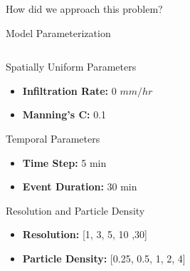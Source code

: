 \documentclass[
  ignorenonframetext,
]{beamer}
\providecommand{\tightlist}{%
  \setlength{\itemsep}{0pt}\setlength{\parskip}{0pt}}\usepackage{longtable,booktabs,array}
\begin{document}
\begin{frame}[fragile]{How did we approach this problem?}
\begin{block}{Model Parameterization}
\begin{columns}[T]
\begin{column}{0.5\textwidth}
\begin{block}{Spatially Uniform Parameters}
\begin{itemize}
\tightlist
\item
  \textbf{Infiltration Rate:} 0 \(mm/hr\)
\end{itemize}

\begin{itemize}
\tightlist
\item
  \textbf{Manning's C:} 0.1
\end{itemize}
\end{block}

\begin{block}{Temporal Parameters}
\label{temporal-parameters}
\begin{itemize}
\tightlist
\item
  \textbf{Time Step:} 5 min
\end{itemize}

\begin{itemize}
\tightlist
\item
  \textbf{Event Duration:} 30 min
\end{itemize}
\end{block}

\begin{block}{Resolution and Particle Density}
\label{resolution-and-particle-density}
\begin{itemize}
\tightlist
\item
  \textbf{Resolution:} {[}1, 3, 5, 10 ,30{]}
\end{itemize}

\begin{itemize}
\tightlist
\item
  \textbf{Particle Density:} {[}0.25, 0.5, 1, 2, 4{]}
\end{itemize}
\end{block}
\end{column}


\end{columns}
\end{block}
\end{frame}
\end{document}
